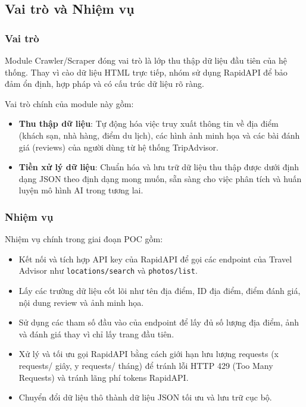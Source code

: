 \subsection{Vai trò và Nhiệm vụ}

\subsubsection{Vai trò}

\quad Module Crawler/Scraper đóng vai trò là lớp thu thập dữ liệu đầu tiên của hệ thống. Thay vì cào dữ liệu HTML trực tiếp, nhóm sử dụng RapidAPI để bảo đảm ổn định, hợp pháp và có cấu trúc dữ liệu rõ ràng.

\quad Vai trò chính của module này gồm:
\begin{itemize}
    \item \textbf{Thu thập dữ liệu}: Tự động hóa việc truy xuất thông tin về địa điểm (khách sạn, nhà hàng, điểm du lịch), các hình ảnh minh họa và các bài đánh giá (reviews) của người dùng từ hệ thống TripAdvisor.
    \item \textbf{Tiền xử lý dữ liệu}: Chuẩn hóa và lưu trữ dữ liệu thu thập được dưới định dạng JSON theo định dạng mong muốn, sẵn sàng cho việc phân tích và huấn luyện mô hình AI trong tương lai.
\end{itemize}

\subsubsection{Nhiệm vụ}

\quad Nhiệm vụ chính trong giai đoạn POC gồm:
\begin{itemize}
    \item Kết nối và tích hợp API key của RapidAPI để gọi các endpoint của Travel Advisor như \texttt{locations/search} và \texttt{photos/list}.
    \item Lấy các trường dữ liệu cốt lõi như tên địa điểm, ID địa điểm, điểm đánh giá, nội dung review và ảnh minh họa.
    \item Sử dụng các tham số đầu vào của endpoint để lấy đủ số lượng địa điểm, ảnh và đánh giá thay vì chỉ lấy trang đầu tiên.
    \item Xử lý và tối ưu gọi RapidAPI bằng cách giới hạn lưu lượng requests (x requests/ giây, y requests/ tháng) để tránh lỗi HTTP 429 (Too Many Requests) và tránh lãng phí tokens RapidAPI.
    \item Chuyển đổi dữ liệu thô thành dữ liệu JSON tối ưu và lưu trữ cục bộ.
\end{itemize}

